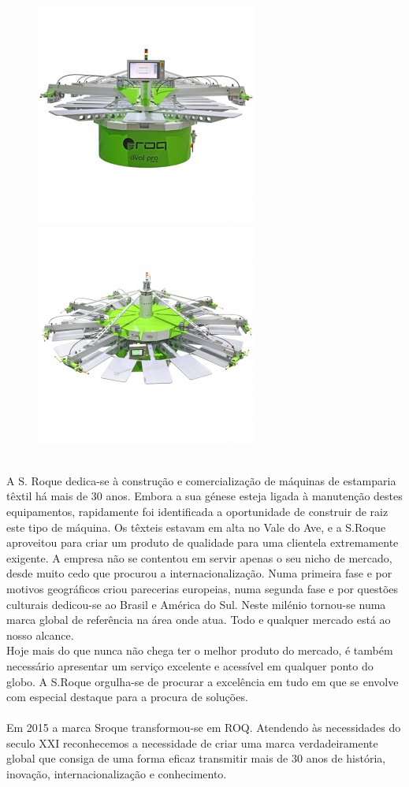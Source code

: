 \begin{figure}[ht]
\begin{center}
\includegraphics[scale=0.5]{"./image/ROQ/maquinas/PRO-600x600-275x275.jpg"}
\includegraphics[scale=0.5]{"./image/ROQ/maquinas/You-600x600-275x275"}
\end{center}
\end{figure}
\\
\newpage
A S. Roque dedica-se à construção e comercialização de máquinas de estamparia têxtil há mais de 30 anos. Embora a sua génese esteja ligada à manutenção destes equipamentos, rapidamente foi identificada a oportunidade de construir de raiz este tipo de máquina. Os têxteis estavam em alta no Vale do Ave, e a S.Roque aproveitou para criar um produto de qualidade para uma clientela extremamente exigente. A empresa não se contentou em servir apenas o seu nicho de mercado, desde muito cedo que procurou a internacionalização. Numa primeira fase e por motivos geográficos criou parecerias europeias, numa segunda fase e por questões culturais dedicou-se ao Brasil e América do Sul. Neste milénio tornou-se numa marca global de referência na área onde atua. Todo e qualquer mercado está ao nosso alcance.\\
Hoje mais do que nunca não chega ter o melhor produto do mercado, é também necessário apresentar um serviço excelente e acessível em qualquer ponto do globo. A S.Roque orgulha-se de procurar a excelência em tudo em que se envolve com especial destaque para a procura de soluções.\\
\\
Em 2015 a marca Sroque transformou-se em ROQ. Atendendo às necessidades do seculo XXI reconhecemos a necessidade de criar uma marca verdadeiramente global que consiga de uma forma eficaz transmitir mais de 30 anos de história, inovação, internacionalização e conhecimento.

